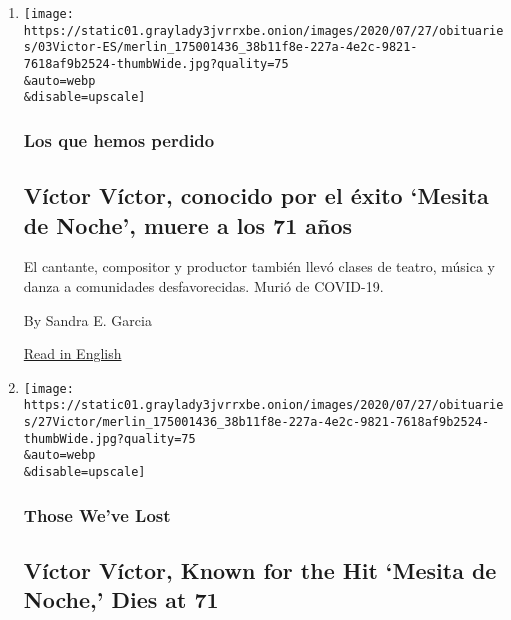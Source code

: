 \begin{enumerate}
\def\labelenumi{\arabic{enumi}.}
\item
  \href{/es/2020/08/03/espanol/cultura/victor-victor-murio-coronavirus.html}{}

  \texttt{[image: https://static01.graylady3jvrrxbe.onion/images/2020/07/27/obituaries/03Victor-ES/merlin\_175001436\_38b11f8e-227a-4e2c-9821-7618af9b2524-thumbWide.jpg?quality=75\\\&auto=webp\\\&disable=upscale]}

  \hypertarget{los-que-hemos-perdido}{%
  \subsubsection{Los que hemos perdido}\label{los-que-hemos-perdido}}

  \hypertarget{vuxedctor-vuxedctor-conocido-por-el-uxe9xito-mesita-de-noche-muere-a-los-71-auxf1os}{%
  \subsection{Víctor Víctor, conocido por el éxito `Mesita de Noche',
  muere a los 71
  años}\label{vuxedctor-vuxedctor-conocido-por-el-uxe9xito-mesita-de-noche-muere-a-los-71-auxf1os}}

  El cantante, compositor y productor también llevó clases de teatro,
  música y danza a comunidades desfavorecidas. Murió de COVID-19.

  By Sandra E. Garcia

  \href{https://www.nytimes3xbfgragh.onion/2020/08/01/obituaries/victor-victor-dead-coronavirus.html}{Read
  in English}
\item
  \href{/2020/08/01/obituaries/victor-victor-dead-coronavirus.html}{}

  \texttt{[image: https://static01.graylady3jvrrxbe.onion/images/2020/07/27/obituaries/27Victor/merlin\_175001436\_38b11f8e-227a-4e2c-9821-7618af9b2524-thumbWide.jpg?quality=75\\\&auto=webp\\\&disable=upscale]}

  \hypertarget{those-weve-lost}{%
  \subsubsection{Those We've Lost}\label{those-weve-lost}}

  \hypertarget{vuxedctor-vuxedctor-known-for-the-hit-mesita-de-noche-dies-at-71}{%
  \subsection{Víctor Víctor, Known for the Hit `Mesita de Noche,' Dies
  at
  71}\label{vuxedctor-vuxedctor-known-for-the-hit-mesita-de-noche-dies-at-71}}


\end{enumerate}
